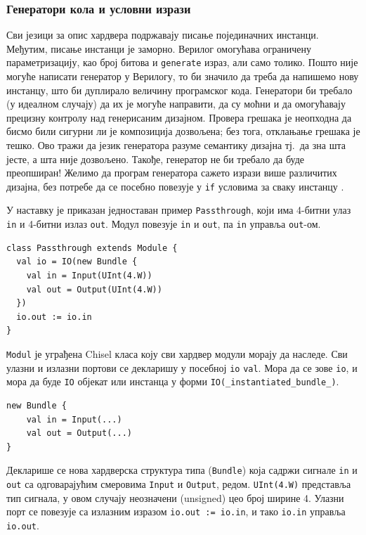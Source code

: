 \documentclass[12pt, a4paper]{article}
\theoremstyle{definition}
\begin{document}
\subsubsection{Генератори кола и условни изрази}
Сви језици за опис хардвера подржавају писање појединачних инстанци. Међутим, писање инстанци је заморно. Верилог омогућава ограничену параметризацију, као број битова и \verb+generate+ израз, али само толико. Пошто није могуће написати генератор у Верилогу, то би значило да треба да напишемо нову инстанцу, што би дуплирало величину програмског кода.
Генератори би требало (у идеалном случају) да их је могуће направити, да су моћни и да омогућавају прецизну контролу над генерисаним дизајном. Провера грешака је неопходна да бисмо били сигурни ли је композиција дозвољена; без тога, отклањање грешака је тешко. Ово тражи да језик генератора разуме семантику дизајна тј.\ да зна шта јесте, а шта није дозвољено. Такође, генератор не би требало да буде преопширан! Желимо да програм генератора сажето изрази више различитих дизајна, без потребе да се посебно повезује у \verb+if+ условима за сваку инстанцу \cite{git_chisel}.

У наставку је приказан једноставан пример \verb+Passthrough+, који има 4-битни улаз \verb+in+ и 4-битни излаз \verb+out+. Модул повезује \verb+in+ и \verb+out+, па \verb+in+ управља \verb+out+-ом.
\begin{verbatim}
class Passthrough extends Module {
  val io = IO(new Bundle {
    val in = Input(UInt(4.W))
    val out = Output(UInt(4.W))
  })
  io.out := io.in
}
\end{verbatim}
\verb+Modul+ је уграђена Chisel класа коју сви хардвер модули морају да наследе. Сви улазни и излазни портови се декларишу у посебној \verb+io+ \verb+val+. Мора да се зове \verb+io+, и мора да буде \verb+IO+ објекат или инстанца у форми \verb+IO(_instantiated_bundle_)+.
\begin{verbatim}
new Bundle {
    val in = Input(...)
    val out = Output(...)
}
\end{verbatim}

Декларише се нова хардверска структура типа (\verb+Bundle+) која садржи сигнале \verb+in+ и \verb+out+ са одговарајућим смеровима \verb+Input+ и \verb+Output+, редом. \verb+UInt(4.W)+ представља тип сигнала, у овом случају неозначени (unsigned) цео број ширине 4. Улазни порт се повезује са излазним изразом \verb+io.out := io.in+, и тако \verb+io.in+ управља \verb+io.out+.
\end{document}
